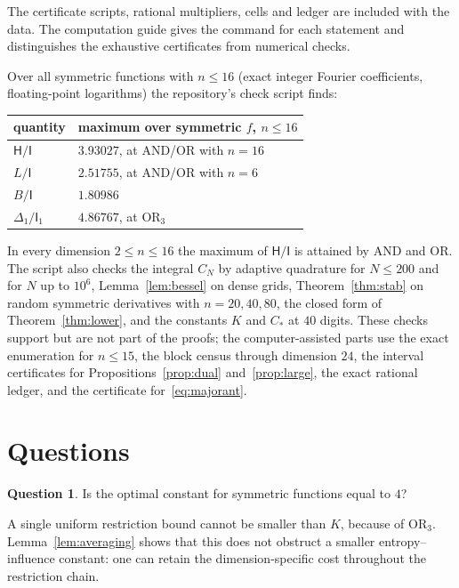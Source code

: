 \documentclass[11pt]{amsart}
\theoremstyle{definition}
\newtheorem{question}[theorem]{Question}
\theoremstyle{remark}
\newcommand{\HH}{\mathsf H}
\newcommand{\I}{\mathsf I}
\begin{document}
The certificate scripts, rational multipliers, cells and ledger are included with the data. The computation guide gives the command for each statement and distinguishes the exhaustive certificates from numerical checks.

Over all symmetric functions with $n\le16$ (exact integer Fourier coefficients, floating-point logarithms) the repository's check script finds:
\begin{center}
\begin{tabular}{@{}ll@{}}
\toprule
quantity & maximum over symmetric $f$, $n\le16$\\
\midrule
$\HH/\I$ & $3.93027$, at AND/OR with $n=16$ \\
$L/\I$ & $2.51755$, at AND/OR with $n=6$ \\
$B/\I$ & $1.80986$ \\
$\Delta_1/\I_1$ & $4.86767$, at $\mathrm{OR}_3$ \\
\bottomrule
\end{tabular}
\end{center}
In every dimension $2\le n\le16$ the maximum of $\HH/\I$ is attained by AND and OR. The script also checks the integral $C_N$ by adaptive quadrature for $N\le200$ and for $N$ up to $10^6$, Lemma~\ref{lem:bessel} on dense grids, Theorem~\ref{thm:stab} on random symmetric derivatives with $n=20,40,80$, the closed form of Theorem~\ref{thm:lower}, and the constants $K$ and $C_*$ at $40$ digits. These checks support but are not part of the proofs; the computer-assisted parts use the exact enumeration for $n\le15$, the block census through dimension $24$, the interval certificates for Propositions~\ref{prop:dual} and~\ref{prop:large}, the exact rational ledger, and the certificate for~\eqref{eq:majorant}.

\section{Questions}

\begin{question}
Is the optimal constant for symmetric functions equal to $4$?
\end{question}

A single uniform restriction bound cannot be smaller than $K$, because of $\mathrm{OR}_3$. Lemma~\ref{lem:averaging} shows that this does not obstruct a smaller entropy--influence constant: one can retain the dimension-specific cost throughout the restriction chain.
\end{document}
